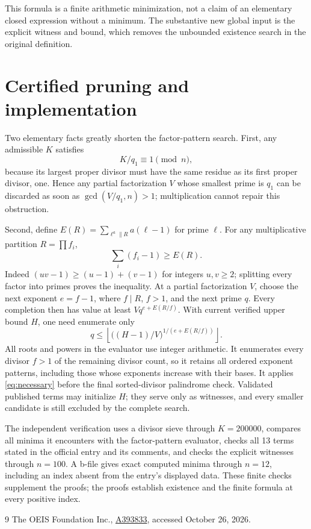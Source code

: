 \documentclass[10pt]{article}
\begin{document}
This formula is a finite arithmetic minimization, not a claim of an
elementary closed expression without a minimum. The substantive new
global input is the explicit witness and bound, which removes the
unbounded existence search in the original definition.

\section{Certified pruning and implementation}
Two elementary facts greatly shorten the factor-pattern search.
First, any admissible $K$ satisfies
\begin{equation}\label{eq:necessary}
 K/q_1\equiv1\pmod n,
\end{equation}
because its largest proper divisor must have the same residue as
its first proper divisor, one. Hence any partial factorization $V$
whose smallest prime is $q_1$ can be discarded as soon as
$\gcd(V/q_1,n)>1$; multiplication cannot repair this obstruction.

Second, define $E(R)=\sum_{\ell^a\parallel R}a(\ell-1)$ for
prime $\ell$. For any multiplicative partition $R=\prod f_i$,
\begin{equation}\label{eq:exponents}
 \sum_i(f_i-1)\ge E(R).
\end{equation}
Indeed $(uv-1)\ge(u-1)+(v-1)$ for integers $u,v\ge2$;
splitting every factor into primes proves the inequality.
At a partial factorization $V$, choose the next exponent $e=f-1$,
where $f\mid R$, $f>1$, and the next prime $q$. Every completion
then has value at least $Vq^{e+E(R/f)}$. With current verified
upper bound $H$, one need enumerate only
\[
 q\le\left\lfloor\bigl((H-1)/V\bigr)^{1/(e+E(R/f))}\right\rfloor.
\]
All roots and powers in the evaluator use integer arithmetic.
It enumerates every divisor $f>1$ of the remaining divisor count,
so it retains all ordered exponent patterns, including those whose
exponents increase with their bases. It applies \eqref{eq:necessary}
before the final sorted-divisor palindrome check. Validated published
terms may initialize $H$; they serve only as witnesses, and every
smaller candidate is still excluded by the complete search.

The independent verification uses a divisor sieve through $K=200000$,
compares all minima it encounters with the factor-pattern evaluator,
checks all 13 terms stated in the official entry and its comments,
and checks the explicit witnesses through $n=100$. A b-file gives
exact computed minima through $n=12$, including an index absent
from the entry's displayed data. These finite checks supplement the
proofs; the proofs establish existence and the finite formula at
every positive index.

\begin{thebibliography}{9}
 The OEIS Foundation Inc.,
\href{https://oeis.org/A393833}{A393833}, accessed October 26, 2026.
\end{thebibliography}
\end{document}
